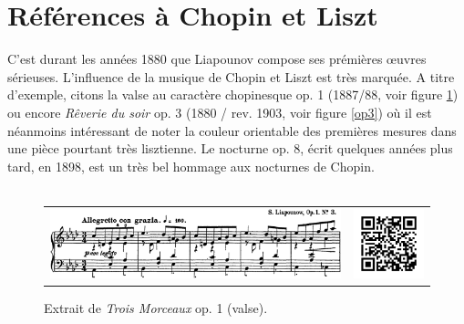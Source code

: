 \section{Références à Chopin et Liszt}

C'est durant les années 1880 que Liapounov compose ses prémières œuvres sérieuses. L'influence de la musique de Chopin et Liszt est très marquée. A titre d'exemple, citons la valse au caractère chopinesque op. 1 (1887/88, voir figure \ref{op1}) ou encore \emph{Rêverie du soir} op. 3 (1880 / rev. 1903, voir figure \ref{op3}) où il est néanmoins intéressant de noter la couleur orientable des premières mesures dans une pièce pourtant très lisztienne. Le nocturne op. 8, écrit quelques années plus tard, en 1898, est un très bel hommage aux nocturnes de Chopin.\\
\\

\begin{figure}[!ht]
  \begin{bigcenter}
    \begin{tabular}{lr}
      \includegraphics[width=12.5cm, keepaspectratio]{op1.png}
      &
      \includegraphics[width=3cm, keepaspectratio]{op1-qr.png}
    \end{tabular}
  \end{bigcenter}
  \caption{\label{op1}Extrait de \emph{Trois Morceaux} op. 1  (valse).}
\end{figure}

